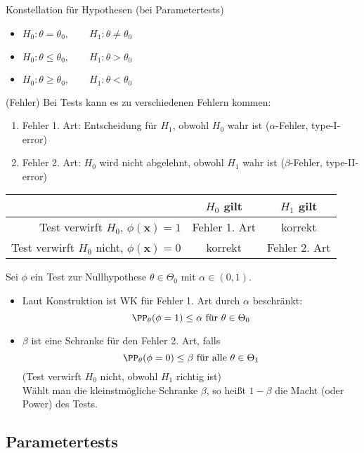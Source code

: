 \documentclass{scrreprt}
\begin{document}
 Konstellation für Hypothesen (bei Parametertests)
\begin{itemize}
\item $H_0: \theta = \theta_0 ,\qquad H_1: \theta \not = \theta_0$
\item $H_0: \theta \leq \theta_0 ,\qquad H_1: \theta > \theta_0$
\item $H_0: \theta \geq \theta_0, \qquad H_1: \theta < \theta_0$
\end{itemize}

 (Fehler) Bei Tests kann es zu verschiedenen Fehlern kommen:
\begin{enumerate}
\item Fehler 1. Art: Entscheidung für $H_1$, obwohl $H_0$ wahr ist ($\alpha$-Fehler, type-I-error)\\
\item Fehler 2. Art: $H_0$ wird nicht abgelehnt, obwohl $H_1$ wahr ist ($\beta$-Fehler, type-II-error)\\
\end{enumerate}
\begin{tabular}{r | c c}
& $H_0$ gilt & $H_1$ gilt\\\hline
Test verwirft $H_0$, $\phi(\mathbf{x})=1$ & Fehler 1. Art & korrekt\\
Test verwirft $H_0$ nicht, $\phi(\mathbf{x})=0$ & korrekt & Fehler 2. Art
\end{tabular}

 Sei $\phi$ ein Test zur Nullhypothese $\theta \in \Theta_0$ mit $\alpha \in (0,1)$.
\begin{itemize}
\item Laut Konstruktion ist WK für Fehler 1. Art durch $\alpha$ beschränkt:
$$\PP_\theta (\phi =1 ) \leq \alpha \text{ für } \theta \in \Theta_0$$
\item $\beta$ ist eine Schranke für den Fehler 2. Art, falls
$$\PP_\theta (\phi =0 )\leq \beta \text{ für alle } \theta \in \Theta_1$$
(Test verwirft $H_0$ nicht, obwohl $H_1$ richtig ist)\\
Wählt man die kleinstmögliche Schranke $\beta$, so heißt $1-\beta$ die Macht (oder Power) des Tests.
\end{itemize}

\subsection{Parametertests}
\end{document}
